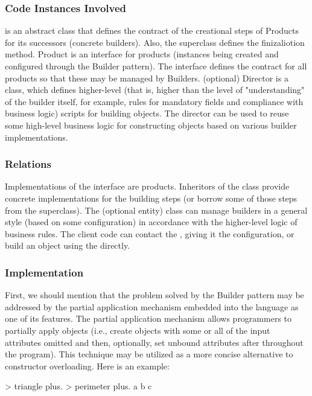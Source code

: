 \documentclass[12pt]{book}
\begin{document}
{{\subsubsection{Code Instances Involved}
 is an abstract class that defines the contract of the creational steps of Products for its successors (concrete builders). Also, the  superclass defines the finizaliotion method. 
Product is an interface for products (instances being created and configured through the Builder pattern). The interface defines the contract for all products so that these may be managed by Builders.
(optional) Director is a class, which defines higher-level (that is, higher than the level of "understanding" of the builder itself, for example, rules for mandatory fields and compliance with business logic) scripts for building objects. The director can be used to reuse some high-level business logic for constructing objects based on various builder implementations.

\subsubsection{Relations}
Implementations of the  interface are products. Inheritors of the  class provide concrete implementations for the building steps (or borrow some of those steps from the superclass). The  (optional entity) class can manage builders in a general style (based on some configuration) in accordance with the higher-level logic of business rules. The client code can contact the , giving it the configuration, or build an object using the  directly.

\subsubsection{Implementation}
First, we should mention that the problem solved by the Builder pattern may be addressed by the partial application mechanism embedded into the language as one of its features. The partial application mechanism allows programmers to partially apply objects (i.e., create objects with some or all of the input attributes omitted and then, optionally, set unbound attributes after throughout the program). This technique may be utilized as a more concise alternative to constructor overloading. Here is an example:
\begin{ffcode}
[a b c name] > triangle
  plus. > perimeter
    plus.
      a
      b
    c


\end{ffcode}}}
\end{document}
